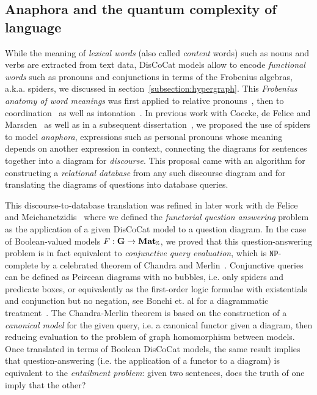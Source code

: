 
\subsection{Anaphora and the quantum complexity of language}

While the meaning of \emph{lexical words} (also called \emph{content} words) such as nouns and verbs are extracted from text data, DisCoCat models allow to encode \emph{functional words} such as pronouns and conjunctions in terms of the Frobenius algebras, a.k.a. spiders, we discussed in section~\ref{subsection:hypergraph}.
This \emph{Frobenius anatomy of word meanings} was first applied to relative pronouns~\cite{SadrzadehEtAl13,SadrzadehEtAl14}, then to coordination~\cite{Kartsaklis16} as well as intonation~\cite{KartsaklisSadrzadeh15}.
In previous work with Coecke, de Felice and Marsden~\cite{CoeckeEtAl18a} as well as in a subsequent dissertation~\cite{Toumi18a}, we proposed the use of spiders to model \emph{anaphora}, expressions such as personal pronouns whose meaning depends on another expression in context, connecting the diagrams for sentences together into a diagram for \emph{discourse}.
This proposal came with an algorithm for constructing a \emph{relational database} from any such discourse diagram and for translating the diagrams of questions into database queries.

This discourse-to-database translation was refined in later work with de Felice and Meichanetzidis~\cite{FeliceEtAl19} where we defined the \emph{functorial question answering} problem as the application of a given DisCoCat model to a question diagram.
In the case of Boolean-valued models $F : \mathbf{G} \to \mathbf{Mat}_{\mathbb{S}}$, we proved that this question-answering problem is in fact equivalent to \emph{conjunctive query evaluation}, which is $\mathtt{NP}$-complete by a celebrated theorem of Chandra and Merlin~\cite{ChandraMerlin77}.
Conjunctive queries can be defined as Peircean diagrams with no bubbles, i.e. only spiders and predicate boxes, or equivalently as the first-order logic formulae with existentials and conjunction but no negation, see Bonchi et. al for a diagrammatic treatment~\cite{BonchiEtAl18}.
The Chandra-Merlin theorem is based on the construction of a \emph{canonical model} for the given query, i.e. a canonical functor given a diagram, then reducing evaluation to the problem of graph homomorphism between models.
Once translated in terms of Boolean DisCoCat models, the same result implies that question-answering (i.e. the application of a functor to a diagram) is equivalent to the \emph{entailment problem}: given two sentences, does the truth of one imply that the other?


